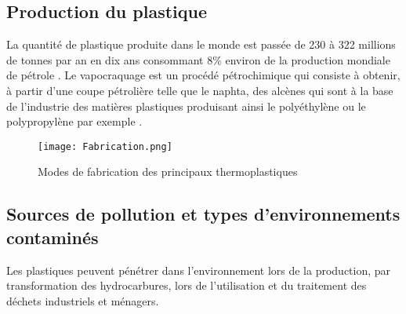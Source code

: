 \subsection{Production du plastique}
\par{
La  quantit\'e  de  plastique  produite  dans  le  monde  est  pass\'ee de 230 \`a 322 millions de tonnes par an en dix ans {\citep{Plasticseurope}} consommant 8\% environ de la production mondiale de p\'etrole {\citep{Planetoscope}}. Le vapocraquage est un proc\'ed\'e p\'etrochimique qui consiste \`a obtenir, \`a partir d'une coupe p\'etroli\`ere telle que le naphta, des alc\`enes qui sont \`a la base de l'industrie des mati\`eres plastiques produisant ainsi le poly\'ethyl\`ene ou le polypropyl\`ene par exemple {\citep{Europetrole}}.
}

\begin{figure}[h]
\centering
\texttt{[image: Fabrication.png]}
\caption{Modes de fabrication des principaux thermoplastiques {\citep{SCF}}} 
\label{fabrication}
\end{figure}
\FloatBarrier

\subsection{Sources de pollution et types d'environnements contamin\'es}
\par{
Les plastiques peuvent p\'en\'etrer dans l'environnement lors de la production, par transformation des hydrocarbures, lors de l'utilisation et du traitement des d\'echets industriels et m\'enagers.
}
